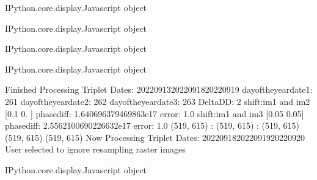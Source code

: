 \documentclass[letterpaper,10pt]{sphinxmanual}
\begin{document}
\begin{sphinxVerbatim}[commandchars=\\\{\}]
\PYGZlt{}IPython.core.display.Javascript object\PYGZgt{}
\end{sphinxVerbatim}



\begin{sphinxVerbatim}[commandchars=\\\{\}]
\PYGZlt{}IPython.core.display.Javascript object\PYGZgt{}
\end{sphinxVerbatim}



\begin{sphinxVerbatim}[commandchars=\\\{\}]
\PYGZlt{}IPython.core.display.Javascript object\PYGZgt{}
\end{sphinxVerbatim}



\begin{sphinxVerbatim}[commandchars=\\\{\}]
\PYGZlt{}IPython.core.display.Javascript object\PYGZgt{}
\end{sphinxVerbatim}



\begin{sphinxVerbatim}[commandchars=\\\{\}]
Finished Processing Triplet Dates:  20220913\PYGZhy{}20220918\PYGZhy{}20220919
day\PYGZus{}of\PYGZus{}the\PYGZus{}year\PYGZus{}date1:  261
\PYGZhy{}\PYGZhy{}\PYGZhy{}\PYGZhy{}\PYGZhy{}\PYGZhy{}\PYGZhy{}\PYGZhy{}\PYGZhy{}\PYGZhy{}\PYGZhy{}\PYGZhy{}\PYGZhy{}\PYGZhy{}\PYGZhy{}\PYGZhy{}\PYGZhy{}\PYGZhy{}\PYGZhy{}\PYGZhy{}\PYGZhy{}
day\PYGZus{}of\PYGZus{}the\PYGZus{}year\PYGZus{}date2:  262
\PYGZhy{}\PYGZhy{}\PYGZhy{}\PYGZhy{}\PYGZhy{}\PYGZhy{}\PYGZhy{}\PYGZhy{}\PYGZhy{}\PYGZhy{}\PYGZhy{}\PYGZhy{}\PYGZhy{}\PYGZhy{}\PYGZhy{}\PYGZhy{}\PYGZhy{}\PYGZhy{}\PYGZhy{}\PYGZhy{}\PYGZhy{}
day\PYGZus{}of\PYGZus{}the\PYGZus{}year\PYGZus{}date3:  263
\PYGZhy{}\PYGZhy{}\PYGZhy{}\PYGZhy{}\PYGZhy{}\PYGZhy{}\PYGZhy{}\PYGZhy{}\PYGZhy{}\PYGZhy{}\PYGZhy{}\PYGZhy{}\PYGZhy{}\PYGZhy{}\PYGZhy{}\PYGZhy{}\PYGZhy{}\PYGZhy{}\PYGZhy{}\PYGZhy{}\PYGZhy{}
Delta\PYGZus{}DD: 2
shift:im1 and im2 [0.1 0. ] phasediff: \PYGZhy{}1.640696379469863e\PYGZhy{}17 error: 1.0
shift:im1 and im3 [\PYGZhy{}0.05  0.05] phasediff: \PYGZhy{}2.5562100690226632e\PYGZhy{}17 error: 1.0
(519, 615) :  (519, 615) :  (519, 615)
(519, 615)
(519, 615)
Now Processing Triplet Dates:  20220918\PYGZhy{}20220919\PYGZhy{}20220920
 User selected to ignore resampling raster images 



\PYGZlt{}IPython.core.display.Javascript object\PYGZgt{}
\end{sphinxVerbatim}
\end{document}
